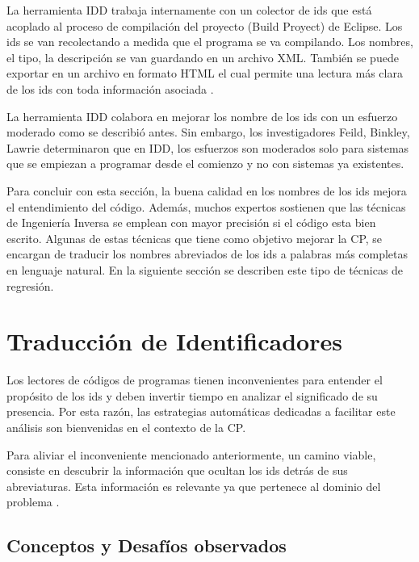 La herramienta IDD trabaja internamente con un colector de ids que está acoplado al proceso de compilación del proyecto (Build Proyect) de Eclipse. Los ids se van recolectando a medida que el programa se va compilando. Los nombres, el tipo, la descripción se van guardando en un archivo XML. También se puede exportar en un archivo en formato HTML el cual permite una lectura más clara de los ids con toda información asociada \cite{DFPM05}.



La herramienta IDD colabora en mejorar los nombre de los ids con un esfuerzo moderado como se describió antes.
Sin embargo, los investigadores Feild, Binkley, Lawrie \cite{LFBEX07,DLHD06} determinaron que en IDD, los esfuerzos son moderados solo para sistemas que se empiezan a programar desde el comienzo y no con sistemas ya existentes.

Para concluir con esta sección, la buena calidad en los nombres de los ids mejora el entendimiento del código. Además, muchos expertos sostienen que las técnicas de Ingeniería Inversa se emplean con mayor precisión si el código esta bien escrito. Algunas de estas técnicas que tiene como objetivo mejorar la CP, se encargan de traducir los nombres abreviados de los ids a palabras más completas en lenguaje natural. En la siguiente sección se describen este tipo de técnicas de regresión.

\pagebreak
\section{Traducción de Identificadores}
\label{sec:tradIdDicc}%

Los lectores de códigos de programas tienen inconvenientes para entender el propósito de los ids y deben invertir tiempo en analizar el significado de su presencia. Por esta razón, las estrategias automáticas dedicadas a facilitar este análisis son bienvenidas en el contexto de la CP.

Para aliviar el inconveniente mencionado anteriormente, un camino viable, consiste en descubrir la información que ocultan los ids detrás de sus abreviaturas. Esta información es relevante ya que pertenece al dominio del problema \cite{EHPV09,LFBEX07}. 

\subsection{Conceptos y Desafíos observados}

